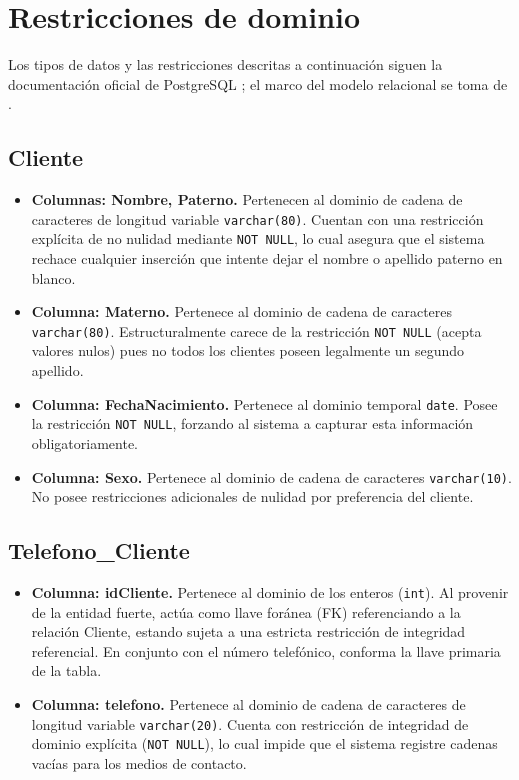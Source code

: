 \documentclass[11pt,letterpaper,spanish]{article}
\begin{document}
\section*{Restricciones de dominio}

Los tipos de datos y las restricciones descritas a continuación siguen la documentación oficial de PostgreSQL \parencite{postgresqlCreateTable,postgresqlDataTypes,postgresqlAlterTable}; el marco del modelo relacional se toma de \textcite{silberschatz2006}.

\subsection*{Cliente}
\begin{itemize}
	\item \textbf{Columnas: Nombre, Paterno.} Pertenecen al dominio de cadena de caracteres de longitud variable \texttt{varchar(80)}. Cuentan con una restricción explícita de no nulidad mediante \texttt{NOT NULL}, lo cual asegura que el sistema rechace cualquier inserción que intente dejar el nombre o apellido paterno en blanco.
	\item \textbf{Columna: Materno.} Pertenece al dominio de cadena de caracteres \texttt{varchar(80)}. Estructuralmente carece de la restricción \texttt{NOT NULL} (acepta valores nulos) pues no todos los clientes poseen legalmente un segundo apellido.
	\item \textbf{Columna: FechaNacimiento.} Pertenece al dominio temporal \texttt{date}. Posee la restricción \texttt{NOT NULL}, forzando al sistema a capturar esta información obligatoriamente.
	\item \textbf{Columna: Sexo.} Pertenece al dominio de cadena de caracteres \texttt{varchar(10)}. No posee restricciones adicionales de nulidad por preferencia del cliente.
\end{itemize}

\subsection*{Telefono\_Cliente}
\begin{itemize}
	\item \textbf{Columna: idCliente.} Pertenece al dominio de los enteros (\texttt{int}). Al provenir de la entidad fuerte, actúa como llave foránea (FK) referenciando a la relación Cliente, estando sujeta a una estricta restricción de integridad referencial. En conjunto con el número telefónico, conforma la llave primaria de la tabla.
	\item \textbf{Columna: telefono.} Pertenece al dominio de cadena de caracteres de longitud variable \texttt{varchar(20)}. Cuenta con restricción de integridad de dominio explícita (\texttt{NOT NULL}), lo cual impide que el sistema registre cadenas vacías para los medios de contacto.
\end{itemize}
\end{document}
